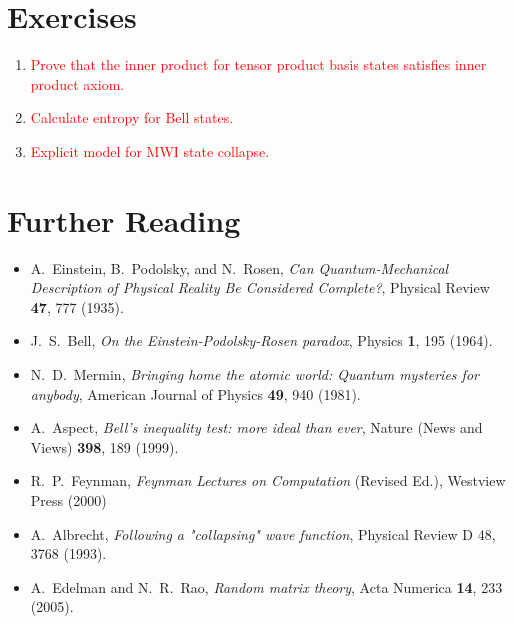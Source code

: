 \documentclass[pra,12pt]{revtex4}
\begin{document}
\section*{Exercises}

\begin{enumerate}
\item \textcolor{red}{Prove that the inner product for tensor product basis states satisfies inner product axiom.}
\item \textcolor{red}{Calculate entropy for Bell states.}
\item \textcolor{red}{Explicit model for MWI state collapse.}
\end{enumerate}

\section*{Further Reading}

\begin{itemize}
\item A.~Einstein, B.~Podolsky, and N.~Rosen,
  \textit{Can Quantum-Mechanical Description of Physical Reality Be
    Considered Complete?}, Physical Review \textbf{47}, 777 (1935).
  \label{cite:epr}

\item J.~S.~Bell, \textit{On the Einstein-Podolsky-Rosen paradox},
  Physics \textbf{1}, 195 (1964). \label{cite:bell}
  
\item N.~D.~Mermin, \textit{Bringing home the atomic world: Quantum
  mysteries for anybody}, American Journal of Physics \textbf{49}, 940
  (1981). \label{cite:mermin}

\item A.~Aspect, \textit{Bell's inequality test: more ideal than ever},
  Nature (News and Views) \textbf{398}, 189 (1999). \label{cite:aspect}

\item R.~P.~Feynman, \textit{Feynman Lectures on Computation} (Revised
  Ed.), Westview Press (2000)
\label{cite:feynman}

\item A.~Albrecht, \textit{Following a "collapsing" wave function},
  Physical Review D \textrm{48}, 3768 (1993).
\label{cite:albrecht}

\item A.~Edelman and N.~R.~Rao, \textit{Random matrix theory}, Acta
  Numerica \textbf{14}, 233 (2005).
\label{cite:edelman}
\end{itemize}
\end{document}
